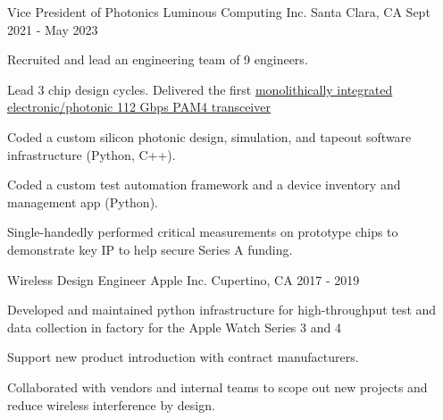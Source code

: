 

\begin{cventries}


  \cventry
    {Vice President of Photonics} %
    {Luminous Computing Inc.}
    {Santa Clara, CA} %
    {Sept 2021 - May 2023} %
    {
      \begin{cvitems} %
        \item {Recruited and lead an engineering team of 9 engineers.}
        \item {Lead 3 chip design cycles. Delivered the first \href{https://preprints.opticaopen.org/articles/preprint/Monolithically_integrated_112_Gbps_PAM4_optical_transmitter_and_receiver_in_a_45nm_CMOS-silicon_photonics_process/22814837}{monolithically integrated electronic/photonic 112 Gbps PAM4 transceiver}}
        \item {Coded a custom silicon photonic design, simulation, and tapeout software infrastructure (Python, C++).}
        \item {Coded a custom test automation framework and a device inventory and management app (Python).}
        \item {Single-handedly performed critical measurements on prototype chips to demonstrate key IP to help secure Series A funding.}
      \end{cvitems}
    }
    
  \cventry
    {Wireless Design Engineer} %
    {Apple Inc. }
    {Cupertino, CA} %
    {2017 - 2019} %
    {
      \begin{cvitems} %
        \item {Developed and maintained python infrastructure for high-throughput test and data collection in factory for the Apple Watch Series 3 and 4}
        \item {Support new product introduction with contract manufacturers.}
        \item {Collaborated with vendors and internal teams to scope out new projects and reduce wireless interference by design.}
      \end{cvitems}
    }
    

\end{cventries}
